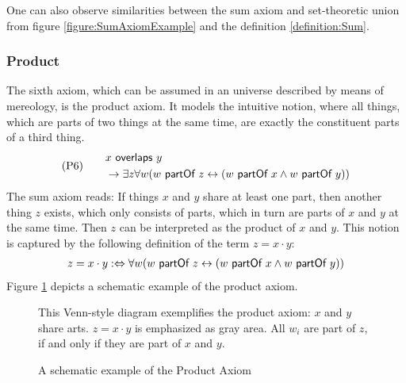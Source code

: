 One can also observe similarities between the sum axiom and set-theoretic union from figure \ref{figure:SumAxiomExample} and the definition \ref{definition:Sum}.

\subsubsection{Product}
The sixth axiom, which can be assumed in an universe described by means of mereology, is the product axiom.
It models the intuitive notion, where all things, which are parts of two things at the same time, are exactly the constituent parts of a third thing.
\begin{align}
&\text{(P6)}
\quad
&\begin{split}
&x ~\textsf{overlaps}~ y 
\\&\rightarrow
\exists z \forall w (w ~\textsf{partOf}~ z \leftrightarrow (w ~\textsf{partOf}~ x \wedge w ~\textsf{partOf}~ y))
\end{split}
\label{axiom:Product}
\end{align}
The sum axiom reads:
If things $x$ and $y$ share at least one part, then another thing $z$ exists, which only consists of parts, which in turn are parts of $x$ and $y$ at the same time.
Then $z$ can be interpreted as the product of $x$ and $y$.
This notion is captured by the following definition of the term $z = x \cdot y$:
\begin{align}
z = x \cdot y
:\Leftrightarrow
\forall w (w ~\textsf{partOf}~ z \leftrightarrow (w ~\textsf{partOf}~ x \wedge w ~\textsf{partOf}~ y))
\label{definition:Product}
\end{align}
Figure \ref{figure:ProductAxiomExample} depicts a schematic example of the product axiom.

\begin{figure}[h!]
\begin{center}
\end{center}
{
\scriptsize 
This Venn-style diagram exemplifies the product axiom:
$x$ and $y$ share arts.
$z = x \cdot y$ is emphasized as gray area.
All $w_i$ are part of $z$, if and only if they are part of $x$ and $y$.
}
\caption{A schematic example of the Product Axiom}
\label{figure:ProductAxiomExample}
\end{figure}

